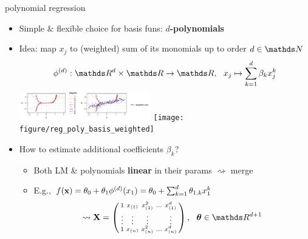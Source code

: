 \documentclass[11pt,compress,t,notes=noshow, xcolor=table]{beamer}
\begin{document}
\begin{frame}{polynomial regression}

\begin{itemize}
    \item Simple \& flexible choice for basis funs: \textbf{$d$-polynomials}
    \item Idea: map $x_j$ to (weighted) sum of its monomials up to order 
    $d \in \N$
    $$ \phi^{(d)}: \R^d \times \R \rightarrow \R, ~~
    x_j \mapsto \sum_{k = 1}^d \beta_k x_j^k$$
    \includegraphics[width=0.45\textwidth]{figure/reg_poly_basis}
    \texttt{[image: figure/reg\_poly\_basis\_weighted]}
    \item How to estimate additional coefficients $\beta_k$? 
    \begin{itemize}
      \item Both LM \& polynomials \textbf{linear} in their params
      $\rightsquigarrow$ merge
      \item E.g.,
      $f(\mathbf{x}) = \theta_0 + \theta_1 \phi^{(d)}(x_1)  =
      \theta_0 + \sum_{k = 1}^d \theta_{1, k} x_1^k$
      $$\rightsquigarrow \Xmat = \left(
      \begin{smallmatrix}
          1 & x_{(1)} & x_{(1)}^2 & \hdots & x_{(1)}^d \\
          \vdots & \vdots & \vdots & & \vdots \\
          1 & x_{(n)} & x_{(n)}^2 & \hdots & x_{(n)}^d \\
      \end{smallmatrix}
      \right),
      ~~ \thetab \in \R^{d + 1}
      $$
    \end{itemize}
\end{itemize}

\end{frame}

\end{document}
